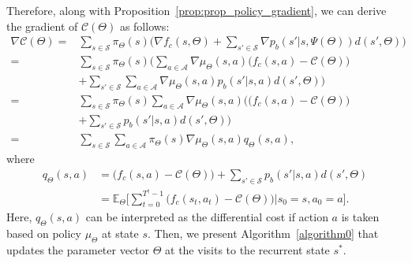 \documentclass[twocolumn,10pt]{IEEEtran}
\begin{document}
Therefore, along with Proposition~\ref{prop:prop_policy_gradient}, we can derive the gradient of $\mathcal{C} (\Theta)$ as follows:
\begin{equation}
\begin{aligned}
\nabla \mathcal{C} (\Theta)  = &	\sum_{s \in \mathcal{S}} \pi_{\Theta}({s}) \Big(\nabla f_c (s, \Theta) + \sum_{s' \in \mathcal{S}} \nabla p_b (s'|s,\Psi(\Theta)) d(s', \Theta) \Big) \\
= &	\sum_{s \in \mathcal{S}} \pi_{\Theta}({s})  \Big( \sum_{a \in \mathcal{A}} \nabla \mu_{\Theta}(s,a) \big( f_c (s, a)  - \mathcal{C} (\Theta)  \big)	\nonumber	\\
&	+ \sum_{s' \in \mathcal{S}} \sum_{a \in \mathcal{A}} \nabla \mu_{\Theta} (s,a) p_b (s'|s,a)  d(s',\Theta)	 \Big) \\
= &	\sum_{s \in \mathcal{S}} \pi_{\Theta}({s}) \sum_{a \in \mathcal{A}} \nabla \mu_{\Theta}(s,a)  \Big(  \big( f_c (s, a)  - \mathcal{C} (\Theta)  \big) \nonumber	\\
&	+ \sum_{s' \in \mathcal{S}} p_b (s'|s,a)  d(s',\Theta)	 \Big) \\ 
= &	\sum_{s \in \mathcal{S}} \sum_{a \in \mathcal{A}} \pi_{\Theta}({s}) \nabla \mu_{\Theta}(s,a) q_{\Theta}(s,a),
\end{aligned}
\end{equation}
where 
\begin{equation}
\begin{aligned}
q_{\Theta}(s,a)&= \big( f_c (s, a)  - \mathcal{C} (\Theta)	\big) + \sum_{s' \in \mathcal{S}} p_b (s'|s,a)  d(s',\Theta)	 \\
&= \mathbb{E}_{\Theta} \Bigg[\sum_{t=0}^{T^{\dagger}-1}\big( f_c ( s_t, a_t) -\mathcal{C} (\Theta) \big) | s_{0} = s, a_{0}=a \Bigg].
\end{aligned}
\end{equation}
Here, $q_{\Theta}(s,a)$ can be interpreted as the differential cost if action $a$ is taken based on policy $\mu_{\Theta}$ at state $s$. Then, we present Algorithm~\ref{algorithm0} that updates the parameter vector $\Theta$ at the visits to the recurrent state $s^{*}$. 
\end{document}
